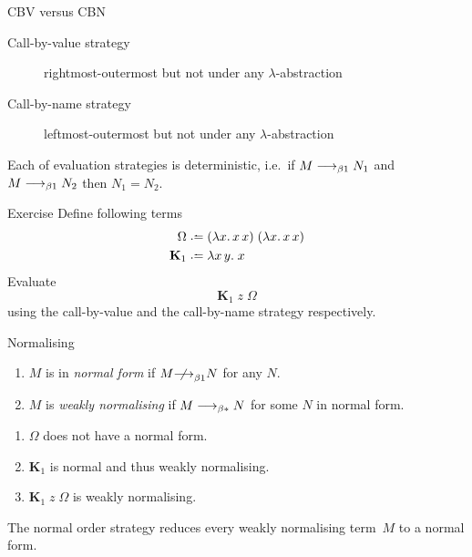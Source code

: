 \begin{frame}{CBV versus CBN}
\begin{description}
  \item[Call-by-value strategy]
    rightmost-outermost but not under any $\lambda$-abstraction
  \item[Call-by-name strategy]
    leftmost-outermost but not under any $\lambda$-abstraction
\end{description}

\begin{proposition}[Determinacy]
  Each of evaluation strategies is deterministic, i.e.\ 
  if $M \longrightarrow_{\beta1} N_1$ and $M \longrightarrow_{\beta1} N_2$ then $N_1 = N_2$.
\end{proposition}
\end{frame}

\begin{frame}{Exercise}
  Define following terms
\begin{align*}
  \Omega &\defeq (\lambda x.\, x\,x)\;(\lambda x.\,x\,x) \\
  \mathbf{K}_1 & \defeq \lambda x\,y.\;x
\end{align*}
Evaluate 
\[
  \mathbf{K}_1\;z\;\Omega
\]
using the call-by-value and the call-by-name strategy respectively.
\end{frame}

\begin{frame}{Normalising}
\begin{definition}
  \begin{enumerate}
    \item $M$ is in \emph{normal form} if $M \notonereduce N$ for any $N$. 
    \item $M$ is \emph{weakly normalising} if $M \longrightarrow_{\beta*} N$ for some $N$ in
      normal form.
  \end{enumerate}
\end{definition}
%
  \begin{enumerate}
    \item $\Omega$ does not have a normal form.
    \item $\mathbf{K}_1$ is normal and thus weakly normalising.
    \item $\mathbf{K}_1\;z\; \Omega$ is weakly normalising.
  \end{enumerate}

\begin{theorem}
  The normal order strategy reduces every weakly
  normalising term~$M$ to a normal form.
\end{theorem}

\end{frame}

